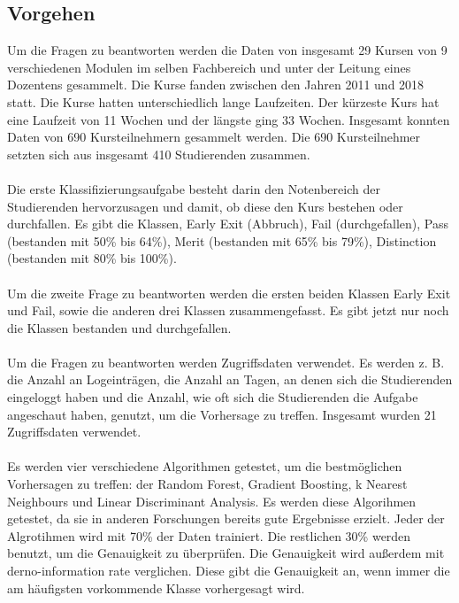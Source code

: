 \subsection{Vorgehen}
Um die Fragen zu beantworten werden die Daten von insgesamt 29 Kursen von 9 verschiedenen Modulen im selben Fachbereich und unter der Leitung eines Dozentens gesammelt.
Die Kurse fanden zwischen den Jahren 2011 und 2018 statt. Die Kurse hatten unterschiedlich lange Laufzeiten. Der kürzeste Kurs hat eine Laufzeit von 11 Wochen und der längste ging 33 Wochen.
Insgesamt konnten Daten von 690 Kursteilnehmern gesammelt werden. Die 690 Kursteilnehmer setzten sich aus insgesamt 410 Studierenden zusammen. \cite[S. 6]{Quinn.2020}
\\ \\
\noindent
Die erste Klassifizierungsaufgabe besteht darin den Notenbereich der Studierenden hervorzusagen und damit, ob diese den Kurs bestehen oder durchfallen.
Es gibt die Klassen, Early Exit (Abbruch), Fail (durchgefallen), Pass (bestanden mit 50\% bis 64\%), Merit (bestanden mit 65\% bis 79\%), Distinction (bestanden mit 80\% bis 100\%). \cite[S. 6f]{Quinn.2020}
\\ \\ \noindent
Um die zweite Frage zu beantworten werden die ersten beiden Klassen Early Exit und Fail, sowie die anderen drei Klassen zusammengefasst.
Es gibt jetzt nur noch die Klassen bestanden und durchgefallen. \cite[S. 6]{Quinn.2020}
\\ \\
\noindent
Um die Fragen zu beantworten werden Zugriffsdaten verwendet. Es werden z. B. die Anzahl an Logeinträgen, die Anzahl an Tagen, an denen sich die Studierenden eingeloggt haben und die Anzahl, wie oft sich die Studierenden die Aufgabe angeschaut haben, genutzt, um die Vorhersage zu treffen. Insgesamt wurden 21 Zugriffsdaten verwendet. \cite[S. 7f]{Quinn.2020}
\\ \\
\noindent
Es werden vier verschiedene Algorithmen getestet, um die bestmöglichen Vorhersagen zu treffen: der Random Forest, Gradient Boosting, k Nearest
Neighbours und Linear Discriminant Analysis. Es werden diese Algorihmen getestet, da sie in anderen Forschungen bereits gute Ergebnisse erzielt.
Jeder der Algrotihmen wird mit 70\% der Daten trainiert. Die restlichen 30\% werden benutzt, um die Genauigkeit zu überprüfen.
Die Genauigkeit wird außerdem mit der\glqq no-information rate\grqq{} verglichen. Diese gibt die Genauigkeit an, wenn immer die am häufigsten vorkommende Klasse vorhergesagt wird. \cite[S. 8f]{Quinn.2020}

